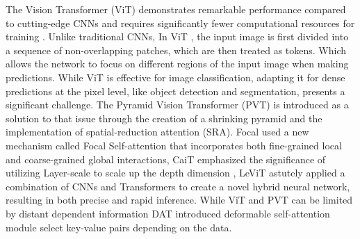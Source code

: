 \documentclass{article}
\begin{document}
The Vision Transformer (ViT) demonstrates remarkable performance compared to cutting-edge CNNs and requires significantly fewer computational resources for training \cite{vit}. Unlike traditional CNNs, In ViT \cite{vit}, the input image is first divided into a sequence of non-overlapping patches, which are then treated as tokens. Which
allows the network to focus on different regions of the input image when
making predictions. While ViT is effective for image classification, adapting it for dense predictions at the pixel level, like object detection and segmentation, presents a significant challenge. The Pyramid Vision Transformer (PVT) \cite{pvt} is introduced as a solution to that issue through the creation of a shrinking pyramid and the implementation of spatial-reduction attention (SRA).
Focal \cite{Focal} used a new mechanism called Focal Self-attention that incorporates both fine-grained local and coarse-grained global interactions, CaiT emphasized the significance of utilizing Layer-scale to scale up the depth dimension \cite{CaiT}, LeViT \cite{levit} astutely applied a combination of CNNs and Transformers to create a novel hybrid neural network, resulting in both precise and rapid inference. While ViT and PVT can be limited by distant dependent information DAT \cite{DAT} introduced deformable self-attention module select key-value pairs depending on the data.
\end{document}
